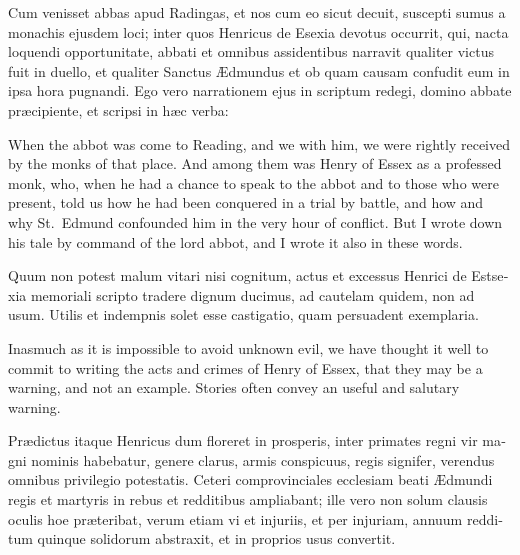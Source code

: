 \documentclass{book}
\begin{document}
\begin{paracol}{2}
\switchcolumn*

\begin{otherlanguage}{latin}
Cum venisset abbas apud Radingas, et nos cum eo sicut decuit, suscepti sumus a monachis ejusdem loci; inter quos Henricus de Esexia devotus occurrit, qui, nacta loquendi opportunitate, abbati et omnibus assidentibus narravit qualiter victus fuit in duello, et qualiter Sanctus \AE{}dmundus et ob quam causam confudit eum in ipsa hora pugnandi. Ego vero narrationem ejus in scriptum redegi, domino abbate pr\ae{}cipiente, et scripsi in h\ae{}c verba:
\end{otherlanguage}

\switchcolumn

When the abbot was come to Reading, and we with him, we were rightly received by the monks of that place. And among them was Henry of Essex as a professed monk, who, when he had a chance to speak to the abbot and to those who were present, told us how he had been conquered in a trial by battle, and how and why St.\ Edmund confounded him in the very hour of conflict. But I wrote down his tale by command of the lord abbot, and I wrote it also in these words.

\switchcolumn*

\begin{otherlanguage}{latin}
Quum non potest malum vitari nisi cognitum, actus et excessus Henrici de Estsexia memoriali scripto tradere dignum ducimus, ad cautelam quidem, non ad usum. Utilis et indempnis solet esse castigatio, quam persuadent exemplaria.
\end{otherlanguage}

\switchcolumn

Inasmuch as it is impossible to avoid unknown evil, we have thought it well to commit to writing the acts and crimes of Henry of Essex, that they may be a warning, and not an example. Stories often convey an useful and salutary warning.

\switchcolumn*

\begin{otherlanguage}{latin}
Pr\ae{}dictus itaque Henricus dum floreret in prosperis, inter primates regni vir magni nominis habebatur, genere clarus, armis conspicuus, regis signifer, verendus omnibus privilegio potestatis. Ceteri comprovinciales ecclesiam beati \AE{}dmundi regis et martyris in rebus et redditibus ampliabant; ille vero non solum clausis oculis hoe pr\ae{}teribat, verum etiam vi et injuriis, et per injuriam, annuum redditum quinque solidorum abstraxit, et in proprios usus convertit.
\end{otherlanguage}


\end{paracol}
\end{document}
